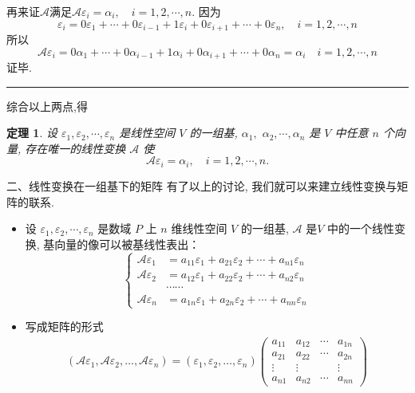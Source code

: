 \documentclass[13pt]{beamer}
\newtheorem{thm}{定理}
\def\qed{\nopagebreak\hfill{\rule{4pt}{7pt}}\medbreak}
\def\A{\mathscr{A}}
\def\a{\alpha}
\begin{document}
\begin{frame}
再来证$\A$满足$\A \varepsilon_{i}={\a}_{i}, \quad i=1, 2, \cdots, n$.
因为
\[
{\varepsilon}_{i}=0 {\varepsilon}_{1}+\cdots+0 {\varepsilon}_{i-1}+1 {\varepsilon}_{i}+0 {\varepsilon}_{i+1}+\cdots+0 {\varepsilon}_{n}, \quad i=1,2, \cdots, n
\]
所以
\[
\A \varepsilon_{i}=0 {\alpha}_{1}+\cdots+0 {\alpha}_{i-1}+1 {\alpha}_{i}+0 {\alpha}_{i+1}+\cdots+0 {\alpha}_{n}={\alpha}_{i} \quad i=1,2, \cdots, n 
\]
证毕.\qed
综合以上两点,得 
\begin{thm}
设 ${\varepsilon}_{1}, {\varepsilon}_{2}, \cdots, {\varepsilon}_{n}$ 是线性空间 $V$ 的一组基, ${\a}_{1},$
${\alpha}_{2}, \cdots, {\alpha}_{n}$ 是 $V$ 中任意 $n$ 个向量, 存在唯一的线性变换 $\A$ 使
\[
\mathcal{A} {\varepsilon}_{i}={\alpha}_{i}, \quad i=1,2, \cdots, n.
\]

\end{thm}
\end{frame}


\begin{frame}{二、线性变换在一组基下的矩阵}
有了以上的讨论, 我们就可以来建立线性变换与矩阵的联系.

\begin{itemize}
	\item  设 ${\varepsilon}_{1}, {\varepsilon}_{2}, \cdots, {\varepsilon}_{n}$ 是数域 $P$ 上 $n$ 维线性空间 $V$ 的一组基, $\A$ 是$V$ 中的一个线性变换, 基向量的像可以被基线性表出：
	$$\left\{\begin{array}{cc}
	\A \varepsilon_{1} & =  a_{11} \varepsilon_{1}+a_{21} \varepsilon_{2}+\cdots+a_{n 1} \varepsilon_{n} \\
	\A \varepsilon_{2} & =  a_{12} \varepsilon_{1}+a_{22} \varepsilon_{2}+\cdots+a_{n 2} \varepsilon_{n} \\ 
	 &   \cdots \cdots \\ 
	\A \varepsilon_{n} & =  a_{1 n} \varepsilon_{1}+a_{2 n} \varepsilon_{2}+\cdots+a_{n n} \varepsilon_{n}
	\end{array}\right.$$
	\item 写成矩阵的形式
	\begin{align*}
	\left(\mathscr{A} \varepsilon_{1}, \mathscr{A} \varepsilon_{2}, \ldots, \mathscr{A} \varepsilon_{n}\right)
	=\left(\varepsilon_{1}, \varepsilon_{2}, \ldots, \varepsilon_{n}\right)
	\left(
	\begin{array}{cccc} 
	a_{11} & a_{12} & \cdots & a_{1 n} \\
	a_{21} & a_{22} & \cdots & a_{2 n} \\
	\vdots & \vdots & & \vdots \\
	a_{n 1} & a_{n 2} & \cdots & a_{n n}
	\end{array}
	\right)
	\end{align*}
\end{itemize}



\end{frame}
\end{document}
